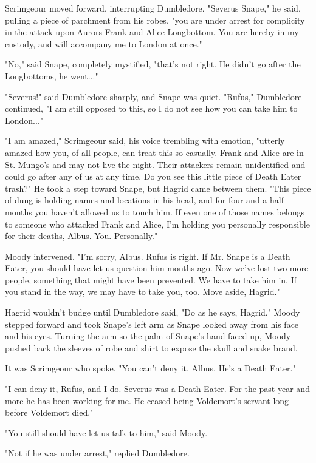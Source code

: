 Scrimgeour moved forward, interrupting Dumbledore. "Severus Snape," he said, pulling a piece of parchment from his robes, "you are under arrest for complicity in the attack upon Aurors Frank and Alice Longbottom. You are hereby in my custody, and will accompany me to London at once."

"No," said Snape, completely mystified, "that's not right. He didn't go after the Longbottoms, he went..."

"Severus!" said Dumbledore sharply, and Snape was quiet. "Rufus," Dumbledore continued, "I am still opposed to this, so I do not see how you can take him to London..."

"I am amazed," Scrimgeour said, his voice trembling with emotion, "utterly amazed how you, of all people, can treat this so casually. Frank and Alice are in St. Mungo's and may not live the night. Their attackers remain unidentified and could go after any of us at any time. Do you see this little piece of Death Eater trash?" He took a step toward Snape, but Hagrid came between them. "This piece of dung is holding names and locations in his head, and for four and a half months you haven't allowed us to touch him. If even one of those names belongs to someone who attacked Frank and Alice, I'm holding you personally responsible for their deaths, Albus. You. Personally."

Moody intervened. "I'm sorry, Albus. Rufus is right. If Mr. Snape is a Death Eater, you should have let us question him months ago. Now we've lost two more people, something that might have been prevented. We have to take him in. If you stand in the way, we may have to take you, too. Move aside, Hagrid."

Hagrid wouldn't budge until Dumbledore said, "Do as he says, Hagrid." Moody stepped forward and took Snape's left arm as Snape looked away from his face and his eyes. Turning the arm so the palm of Snape's hand faced up, Moody pushed back the sleeves of robe and shirt to expose the skull and snake brand.

It was Scrimgeour who spoke. "You can't deny it, Albus. He's a Death Eater."

"I can deny it, Rufus, and I do. Severus was a Death Eater. For the past year and more he has been working for me. He ceased being Voldemort's servant long before Voldemort died."

"You still should have let us talk to him," said Moody.

"Not if he was under arrest," replied Dumbledore.

